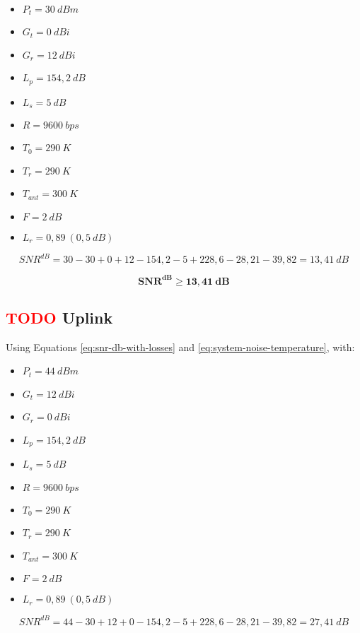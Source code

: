 \begin{itemize}
    \item $P_{t} = 30\ dBm$
    \item $G_{t} = 0\ dBi$
    \item $G_{r} = 12\ dBi$
    \item $L_{p} = 154,2\ dB$
    \item $L_{s} = 5\ dB$
    \item $R = 9600\ bps$
    \item $T_{0} = 290\ K$
    \item $T_{r} = 290\ K$
    \item $T_{ant} = 300\ K$
    \item $F = 2\ dB$
    \item $L_{r} = 0,89\ (0,5\ dB)$
\end{itemize}

\begin{equation}
    SNR^{dB} = 30 - 30 + 0 + 12 - 154,2 - 5 + 228,6 - 28,21 - 39,82 = 13,41\ dB
\end{equation}

\begin{equation}
\mathbf{SNR^{dB} \geq 13,41\ dB}
\end{equation}

\subsection{ \textcolor{red}{TODO} Uplink}

Using Equations \ref{eq:snr-db-with-losses} and \ref{eq:system-noise-temperature}, with:

\begin{itemize}
    \item $P_{t} = 44\ dBm$
    \item $G_{t} = 12\ dBi$
    \item $G_{r} = 0\ dBi$
    \item $L_{p} = 154,2\ dB$
    \item $L_{s} = 5\ dB$
    \item $R = 9600\ bps$
    \item $T_{0} = 290\ K$
    \item $T_{r} = 290\ K$
    \item $T_{ant} = 300\ K$
    \item $F = 2\ dB$
    \item $L_{r} = 0,89\ (0,5\ dB)$
\end{itemize}

\begin{equation}
    SNR^{dB} = 44 - 30 + 12 + 0 - 154,2 - 5 + 228,6 - 28,21 - 39,82 = 27,41\ dB
\end{equation}


